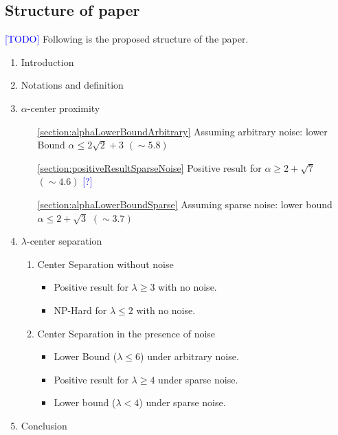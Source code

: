 \documentclass[anon,12pt]{colt2016} %
\newcommand{\todo}{\textcolor{blue}{[TODO]}\xspace}
\newcommand{\q}{\textcolor{blue}{[?]}\xspace}
\begin{document}
\subsection{Structure of paper}
\todo Following is the proposed structure of the paper.
\vspace{-0.1in}\begin{enumerate}
\setlength\itemsep{0em}
\item Introduction
\item Notations and definition
\item $\alpha$-center proximity	\vspace{-0.1in}
	\begin{enumerate}[leftmargin=32pt]
	\renewcommand{\labelenumii}{\theenumii}
	\renewcommand{\theenumii}{\theenumi.\arabic{enumii}.}
	\setlength\itemsep{0em}
	\item[\ref{section:alphaLowerBoundArbitrary}] Assuming arbitrary noise: lower Bound $\alpha \le 2\sqrt{2} + 3$ $(\sim 5.8)$
	\item[\ref{section:positiveResultSparseNoise}] Positive result for $\alpha \ge 2+\sqrt{7}$ $(\sim 4.6)$ \q
	\item[\ref{section:alphaLowerBoundSparse}] Assuming sparse noise: lower bound $\alpha \le 2+\sqrt{3}$ $(\sim 3.7)$
	\end{enumerate}
\item $\lambda$-center separation \vspace{-0.1in}
	\begin{enumerate}[leftmargin=32pt]
	\renewcommand{\labelenumii}{\theenumii}
	\renewcommand{\theenumii}{\theenumi.\arabic{enumii}.}
	\setlength\itemsep{0em}
	\item Center Separation without noise
	\begin{itemize}
	\item Positive result for $\lambda \ge 3$ with no noise.
	\item NP-Hard for $\lambda \le 2$ with no noise.
	\end{itemize}
	\item Center Separation in the presence of noise \begin{itemize}
	\item Lower Bound ($\lambda \le 6$) under arbitrary noise.
	\item Positive result for $\lambda \ge 4$ under sparse noise.
	\item Lower bound ($\lambda < 4$) under sparse noise.
	\end{itemize}
	\end{enumerate}
\item Conclusion
\end{enumerate}
\end{document}
